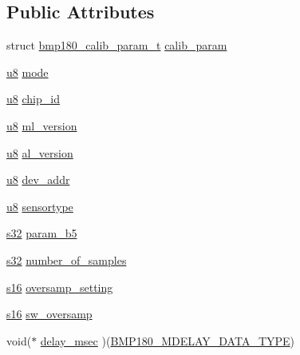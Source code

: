 \subsection*{Public Attributes}
\begin{DoxyCompactItemize}
\item 
struct \hyperlink{structbmp180__calib__param__t}{bmp180\+\_\+calib\+\_\+param\+\_\+t} \hyperlink{structbmp180__t_af9052e0c95ba7c63157703465ff14ef1}{calib\+\_\+param}
\item 
\hyperlink{BMP180_8hpp_a92c50087ca0e64fa93fc59402c55f8ca}{u8} \hyperlink{structbmp180__t_ac5514a7ce3e3d23f7a6722711039edba}{mode}
\item 
\hyperlink{BMP180_8hpp_a92c50087ca0e64fa93fc59402c55f8ca}{u8} \hyperlink{structbmp180__t_af41f334824c5e9e6d0bb72507a734dec}{chip\+\_\+id}
\item 
\hyperlink{BMP180_8hpp_a92c50087ca0e64fa93fc59402c55f8ca}{u8} \hyperlink{structbmp180__t_a369cb61fc9c7de06061f13eb8be5aa34}{ml\+\_\+version}
\item 
\hyperlink{BMP180_8hpp_a92c50087ca0e64fa93fc59402c55f8ca}{u8} \hyperlink{structbmp180__t_aef41548b2ff2ff3cc7db7984cace6918}{al\+\_\+version}
\item 
\hyperlink{BMP180_8hpp_a92c50087ca0e64fa93fc59402c55f8ca}{u8} \hyperlink{structbmp180__t_a1fac092bc595a86dc1dae9604f557d5e}{dev\+\_\+addr}
\item 
\hyperlink{BMP180_8hpp_a92c50087ca0e64fa93fc59402c55f8ca}{u8} \hyperlink{structbmp180__t_a9b9ced8e0fdb8fb0ab04a875e4d46f38}{sensortype}
\item 
\hyperlink{BMP180_8hpp_ae9b1af5c037e57a98884758875d3a7c4}{s32} \hyperlink{structbmp180__t_ae753cf9c8d8f28a1b3395c472acb61fb}{param\+\_\+b5}
\item 
\hyperlink{BMP180_8hpp_ae9b1af5c037e57a98884758875d3a7c4}{s32} \hyperlink{structbmp180__t_a919c92f3b67c115eb7546855d3322f8f}{number\+\_\+of\+\_\+samples}
\item 
\hyperlink{BMP180_8hpp_aa980e2c02ba2305e0f489d5650655425}{s16} \hyperlink{structbmp180__t_a6ade944cf9275b333add5785f33701bd}{oversamp\+\_\+setting}
\item 
\hyperlink{BMP180_8hpp_aa980e2c02ba2305e0f489d5650655425}{s16} \hyperlink{structbmp180__t_a0bda5ec8f08249ee69f2e4a14df59f6e}{sw\+\_\+oversamp}
\item 
void($\ast$ \hyperlink{structbmp180__t_ad6875c8bcf81da576a90decbdf0f2a93}{delay\+\_\+msec} )(\hyperlink{BMP180_8hpp_a41a86f515b1a9c1fdd9b74a2a307be08}{B\+M\+P180\+\_\+\+M\+D\+E\+L\+A\+Y\+\_\+\+D\+A\+T\+A\+\_\+\+T\+Y\+PE})
\end{DoxyCompactItemize}


